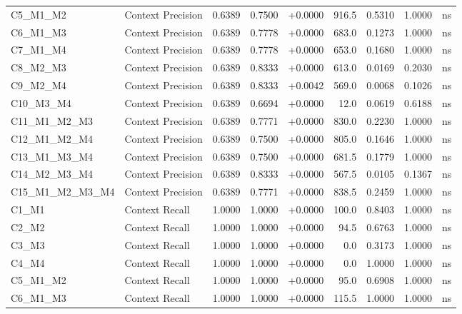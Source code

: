 \begin{table}[p]
\begin{tabular*}{\textwidth}{@{\extracolsep{\fill}} l l r r r r r r c @{}}
\addlinespace
C5\_M1\_M2      & Context Precision    & 0.6389 & 0.7500 & +0.0000 & 916.5 & 0.5310 & 1.0000 & ns \\
\addlinespace
C6\_M1\_M3      & Context Precision    & 0.6389 & 0.7778 & +0.0000 & 683.0 & 0.1273 & 1.0000 & ns \\
\addlinespace
C7\_M1\_M4      & Context Precision    & 0.6389 & 0.7778 & +0.0000 & 653.0 & 0.1680 & 1.0000 & ns \\
\addlinespace
C8\_M2\_M3      & Context Precision    & 0.6389 & 0.8333 & +0.0000 & 613.0 & 0.0169 & 0.2030 & ns \\
\addlinespace
C9\_M2\_M4      & Context Precision    & 0.6389 & 0.8333 & +0.0042 & 569.0 & 0.0068 & 0.1026 & ns \\
\addlinespace
C10\_M3\_M4     & Context Precision    & 0.6389 & 0.6694 & +0.0000 & 12.0 & 0.0619 & 0.6188 & ns \\
\addlinespace
C11\_M1\_M2\_M3 & Context Precision    & 0.6389 & 0.7771 & +0.0000 & 830.0 & 0.2230 & 1.0000 & ns \\
\addlinespace
C12\_M1\_M2\_M4 & Context Precision    & 0.6389 & 0.7500 & +0.0000 & 805.0 & 0.1646 & 1.0000 & ns \\
\addlinespace
C13\_M1\_M3\_M4 & Context Precision    & 0.6389 & 0.7500 & +0.0000 & 681.5 & 0.1779 & 1.0000 & ns \\
\addlinespace
C14\_M2\_M3\_M4 & Context Precision    & 0.6389 & 0.8333 & +0.0000 & 567.5 & 0.0105 & 0.1367 & ns \\
\addlinespace
C15\_M1\_M2\_M3\_M4 & Context Precision    & 0.6389 & 0.7771 & +0.0000 & 838.5 & 0.2459 & 1.0000 & ns \\
\addlinespace
C1\_M1          & Context Recall       & 1.0000 & 1.0000 & +0.0000 & 100.0 & 0.8403 & 1.0000 & ns \\
\addlinespace
C2\_M2          & Context Recall       & 1.0000 & 1.0000 & +0.0000 & 94.5 & 0.6763 & 1.0000 & ns \\
\addlinespace
C3\_M3          & Context Recall       & 1.0000 & 1.0000 & +0.0000 & 0.0 & 0.3173 & 1.0000 & ns \\
\addlinespace
C4\_M4          & Context Recall       & 1.0000 & 1.0000 & +0.0000 & 0.0 & 1.0000 & 1.0000 & ns \\
\addlinespace
C5\_M1\_M2      & Context Recall       & 1.0000 & 1.0000 & +0.0000 & 95.0 & 0.6908 & 1.0000 & ns \\
\addlinespace
C6\_M1\_M3      & Context Recall       & 1.0000 & 1.0000 & +0.0000 & 115.5 & 1.0000 & 1.0000 & ns \\

\end{tabular*}
\end{table}
